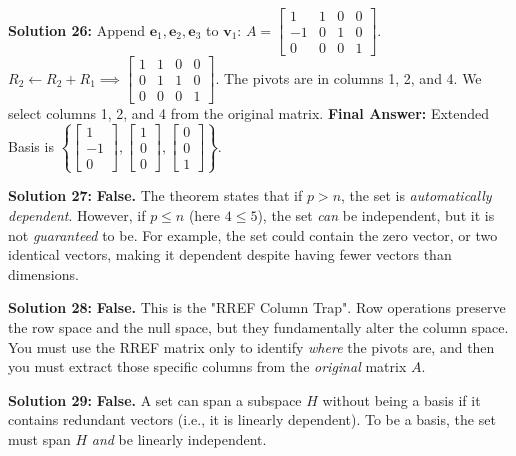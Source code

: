 \documentclass[11pt]{article}
\begin{document}
\vspace{0.5cm}
\textbf{Solution 26:}
Append $\mathbf{e}_1, \mathbf{e}_2, \mathbf{e}_3$ to $\mathbf{v}_1$:
$A = \begin{bmatrix} 1 & 1 & 0 & 0 \\ -1 & 0 & 1 & 0 \\ 0 & 0 & 0 & 1 \end{bmatrix}$.
$R_2 \leftarrow R_2 + R_1 \implies \begin{bmatrix} 1 & 1 & 0 & 0 \\ 0 & 1 & 1 & 0 \\ 0 & 0 & 0 & 1 \end{bmatrix}$.
The pivots are in columns 1, 2, and 4. We select columns 1, 2, and 4 from the original matrix.
\textbf{Final Answer:} Extended Basis is $\left\{ \begin{bmatrix} 1 \\ -1 \\ 0 \end{bmatrix}, \begin{bmatrix} 1 \\ 0 \\ 0 \end{bmatrix}, \begin{bmatrix} 0 \\ 0 \\ 1 \end{bmatrix} \right\}$.

\vspace{0.5cm}
\textbf{Solution 27:}
\textbf{False.} The theorem states that if $p > n$, the set is \textit{automatically dependent}. However, if $p \le n$ (here $4 \le 5$), the set \textit{can} be independent, but it is not \textit{guaranteed} to be. For example, the set could contain the zero vector, or two identical vectors, making it dependent despite having fewer vectors than dimensions.

\vspace{0.5cm}
\textbf{Solution 28:}
\textbf{False.} This is the "RREF Column Trap". Row operations preserve the row space and the null space, but they fundamentally alter the column space. You must use the RREF matrix only to identify \textit{where} the pivots are, and then you must extract those specific columns from the \textit{original} matrix $A$.

\vspace{0.5cm}
\textbf{Solution 29:}
\textbf{False.} A set can span a subspace $H$ without being a basis if it contains redundant vectors (i.e., it is linearly dependent). To be a basis, the set must span $H$ \textit{and} be linearly independent.
\end{document}
